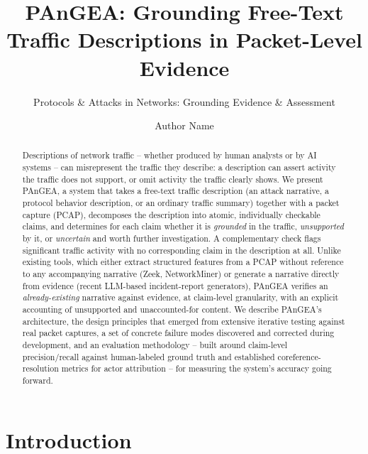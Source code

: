 \documentclass[sigconf,nonacm]{acmart}
\begin{document}
\title{PAnGEA: Grounding Free-Text Traffic Descriptions in Packet-Level Evidence}
\subtitle{Protocols \& Attacks in Networks: Grounding Evidence \& Assessment}

\author{Author Name}

\renewcommand{\shortauthors}{Author Name}

\begin{abstract}
Descriptions of network traffic -- whether produced by human analysts or by AI
systems -- can misrepresent the traffic they describe: a description can assert
activity the traffic does not support, or omit activity the traffic clearly
shows. We present PAnGEA, a system that takes a free-text traffic description
(an attack narrative, a protocol behavior description, or an ordinary traffic
summary) together with a packet capture (PCAP), decomposes the description into
atomic, individually checkable claims, and determines for each claim whether it
is \emph{grounded} in the traffic, \emph{unsupported} by it, or \emph{uncertain}
and worth further investigation. A complementary check flags significant traffic
activity with no corresponding claim in the description at all. Unlike existing
tools, which either extract structured features from a PCAP without reference to
any accompanying narrative (Zeek, NetworkMiner) or generate a narrative directly
from evidence (recent LLM-based incident-report generators), PAnGEA verifies an
\emph{already-existing} narrative against evidence, at claim-level granularity,
with an explicit accounting of unsupported and unaccounted-for content. We
describe PAnGEA's architecture, the design principles that emerged from
extensive iterative testing against real packet captures, a set of concrete
failure modes discovered and corrected during development, and an evaluation
methodology -- built around claim-level precision/recall against human-labeled
ground truth and established coreference-resolution metrics for actor
attribution -- for measuring the system's accuracy going forward.
\end{abstract}

\maketitle

\section{Introduction}
\end{document}
